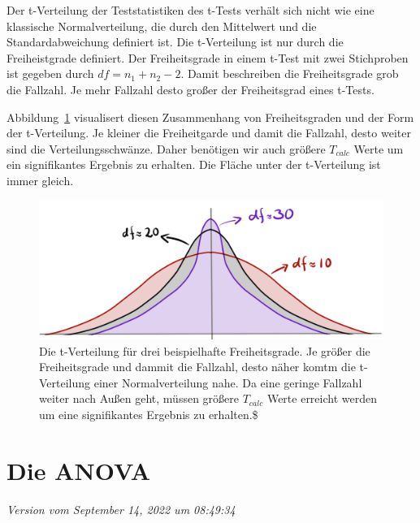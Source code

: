 \documentclass[
  letterpaper,
]{scrbook}
\begin{document}
Der t-Verteilung der Teststatistiken des t-Tests verhält sich nicht wie
eine klassische Normalverteilung, die durch den Mittelwert und die
Standardabweichung definiert ist. Die t-Verteilung ist nur durch die
Freiheistgrade definiert. Der Freiheitsgrade in einem t-Test mit zwei
Stichproben ist gegeben durch \(df = n_1 + n_2 -2\). Damit beschreiben
die Freiheitsgrade grob die Fallzahl. Je mehr Fallzahl desto großer der
Freiheitsgrad eines t-Tests.

Abbildung~\ref{fig-ttest-06} visualisert diesen Zusammenhang von
Freiheitsgraden und der Form der t-Verteilung. Je kleiner die
Freiheitgarde und damit die Fallzahl, desto weiter sind die
Verteilungsschwänze. Daher benötigen wir auch größere \(T_{calc}\) Werte
um ein signifikantes Ergebnis zu erhalten. Die Fläche unter der
t-Verteilung ist immer gleich.

\begin{figure}

{\centering \includegraphics{./images/t-verteilung_06.png}

}

\caption{\label{fig-ttest-06}Die t-Verteilung für drei beispielhafte
Freiheitsgrade. Je größer die Freiheitsgrade und dammit die Fallzahl,
desto näher komtm die t-Verteilung einer Normalverteilung nahe. Da eine
geringe Fallzahl weiter nach Außen geht, müssen größere \(T_{calc}\)
Werte erreicht werden um eine signifikantes Ergebnis zu erhalten.\$}

\end{figure}

\hypertarget{sec-anova}{%
\chapter{Die ANOVA}\label{sec-anova}}

\emph{Version vom September 14, 2022 um 08:49:34}

{}
\end{document}

